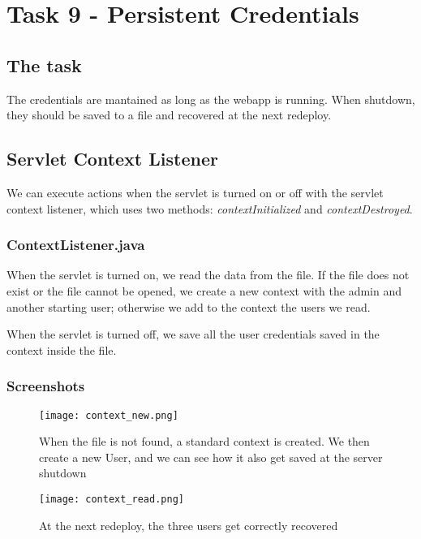 \section{Task 9 - Persistent Credentials}
\subsection{The task}
The credentials are mantained as long as the webapp is running. When shutdown, they should be saved to a file and recovered at the next redeploy.
\subsection{Servlet Context Listener}
We can execute actions when the servlet is turned on or off with the servlet context listener, which uses two methods: \textit{contextInitialized} and \textit{contextDestroyed}.
\subsubsection{ContextListener.java}
When the servlet is turned on, we read the data from the file. If the file does not exist or the file cannot be opened, we create a new context with the admin and another starting user; otherwise we add to the context the users we read.

When the servlet is turned off, we save all the user credentials saved in the context inside the file.


\subsubsection{Screenshots}
\begin{figure}[H]
  \centering
  \texttt{[image: context\_new.png]}
  \caption{When the file is not found, a standard context is created. We then create a new User, and we can see how it also get saved at the server shutdown}
\end{figure}
\begin{figure}[H]
  \centering
  \texttt{[image: context\_read.png]}
  \caption{At the next redeploy, the three users get correctly recovered}
\end{figure}